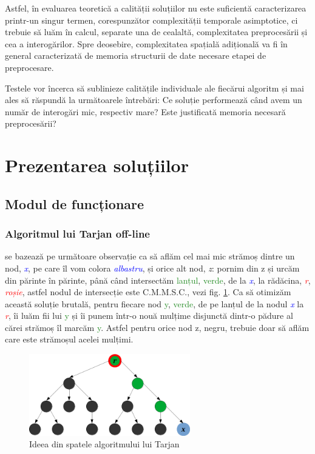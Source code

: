 \documentclass[runningheads]{llncs}
\begin{document}
Astfel, în evaluarea teoretică a calității soluțiilor nu este suficientă caracterizarea printr-un singur termen, corespunzător complexității temporale asimptotice, ci trebuie să luăm în calcul, separate una de cealaltă, complexitatea preprocesării și cea a interogărilor. Spre deosebire, complexitatea spațială adițională va fi în general caracterizată de memoria structurii de date necesare etapei de preprocesare.

Testele vor încerca să sublinieze calitățile individuale ale fiecărui algoritm și mai ales să răspundă la următoarele întrebări: Ce soluție performează când avem un număr de interogări mic, respectiv mare? Este justificată memoria necesară preprocesării?

\section{Prezentarea soluțiilor}

\subsection{Modul de funcționare}

\subsubsection{Algoritmul lui Tarjan off-line} se bazează pe următoare observație ca să aflăm cel mai mic strămoș dintre un nod, \textcolor{blue}{\emph{x}}, pe care îl vom colora \textcolor{blue}{\emph{albastru}}, și orice alt nod, \emph{z}: pornim din z și urcăm din părinte în părinte, până când intersectăm \textcolor{ForestGreen}{lanțul}, \textcolor{ForestGreen}{verde}, de la \textcolor{blue}{\emph{x}}, la rădăcina, \textcolor{red}{\emph{r}}, \textcolor{red}{\emph{roșie}}, astfel nodul de intersecție este C.M.M.S.C., vezi fig. \ref{fig:tarjan_pic}. Ca să otimizăm această soluție brutală, pentru fiecare nod \textcolor{ForestGreen}{y}, \textcolor{ForestGreen}{verde}, de pe lanțul de la nodul \textcolor{blue}{\emph{x}} la \textcolor{red}{\emph{r}}, îi luăm fii lui \textcolor{ForestGreen}{y} și îi punem într-o nouă mulțime disjunctă dintr-o pădure al cărei strămoș îl marcăm \textcolor{ForestGreen}{y}. Astfel pentru orice nod z, negru, trebuie doar să aflăm care este strămoșul acelei mulțimi.

\begin{figure}
    \centering
    \includegraphics[width=7cm]{arbore_tarjan.png}
    \caption{Ideea din spatele algoritmului lui Tarjan}
    \label{fig:tarjan_pic}
\end{figure}
\end{document}
